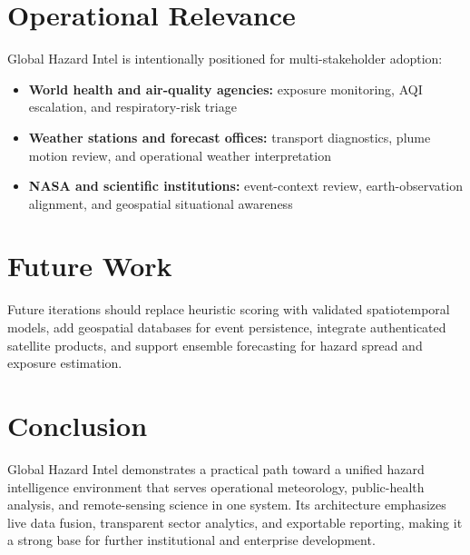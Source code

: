 \documentclass[conference]{IEEEtran}
\begin{document}
\section{Operational Relevance}
Global Hazard Intel is intentionally positioned for multi-stakeholder adoption:
\begin{itemize}
    \item \textbf{World health and air-quality agencies:} exposure monitoring, AQI escalation, and respiratory-risk triage
    \item \textbf{Weather stations and forecast offices:} transport diagnostics, plume motion review, and operational weather interpretation
    \item \textbf{NASA and scientific institutions:} event-context review, earth-observation alignment, and geospatial situational awareness
\end{itemize}

\section{Future Work}
Future iterations should replace heuristic scoring with validated spatiotemporal models, add geospatial databases for event persistence, integrate authenticated satellite products, and support ensemble forecasting for hazard spread and exposure estimation.

\section{Conclusion}
Global Hazard Intel demonstrates a practical path toward a unified hazard intelligence environment that serves operational meteorology, public-health analysis, and remote-sensing science in one system. Its architecture emphasizes live data fusion, transparent sector analytics, and exportable reporting, making it a strong base for further institutional and enterprise development.



\end{document}
